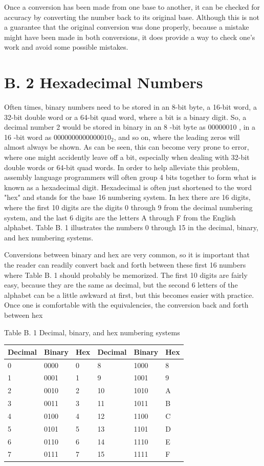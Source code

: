 \documentclass[10pt]{book}
\begin{document}
Once a conversion has been made from one base to another, it can be checked for accuracy by converting the number back to its original base. Although this is not a guarantee that the original conversion was done properly, because a mistake might have been made in both conversions, it does provide a way to check one's work and avoid some possible mistakes.

\section{B. 2 Hexadecimal Numbers}
Often times, binary numbers need to be stored in an 8-bit byte, a 16-bit word, a 32-bit double word or a 64-bit quad word, where a bit is a binary digit. So, a decimal number 2 would be stored in binary in an 8 -bit byte as 00000010 , in a 16 -bit word as $0000000000000010_{2}$, and so on, where the leading zeros will almost always be shown. As can be seen, this can become very prone to error, where one might accidently leave off a bit, especially when dealing with 32-bit double words or 64-bit quad words. In order to help alleviate this problem, assembly language programmers will often group 4 bits together to form what is known as a hexadecimal digit. Hexadecimal is often just shortened to the word "hex" and stands for the base 16 numbering system. In hex there are 16 digits, where the first 10 digits are the digits 0 through 9 from the decimal numbering system, and the last 6 digits are the letters A through F from the English alphabet. Table B. 1 illustrates the numbers 0 through 15 in the decimal, binary, and hex numbering systems.

Conversions between binary and hex are very common, so it is important that the reader can readily convert back and forth between these first 16 numbers where Table B. 1 should probably be memorized. The first 10 digits are fairly easy, because they are the same as decimal, but the second 6 letters of the alphabet can be a little awkward at first, but this becomes easier with practice. Once one is comfortable with the equivalencies, the conversion back and forth between hex

Table B. 1 Decimal, binary, and hex numbering systems

\begin{center}
\begin{tabular}{|l|l|l|l|l|l|}
\hline
Decimal & Binary & Hex & Decimal & Binary & Hex \\
\hline
0 & 0000 & 0 & 8 & 1000 & 8 \\
\hline
1 & 0001 & 1 & 9 & 1001 & 9 \\
\hline
2 & 0010 & 2 & 10 & 1010 & A \\
\hline
3 & 0011 & 3 & 11 & 1011 & B \\
\hline
4 & 0100 & 4 & 12 & 1100 & C \\
\hline
5 & 0101 & 5 & 13 & 1101 & D \\
\hline
6 & 0110 & 6 & 14 & 1110 & E \\
\hline
7 & 0111 & 7 & 15 & 1111 & F \\
\hline
\end{tabular}
\end{center}
\end{document}

